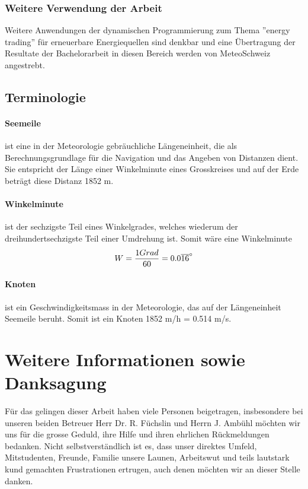 \documentclass[a4paper,10pt]{article}
\begin{document}
\subsubsection{Weitere Verwendung der Arbeit}
Weitere Anwendungen der dynamischen Programmierung zum Thema ''energy
trading'' für erneuerbare Energiequellen sind denkbar und eine Übertragung der
Resultate der Bachelorarbeit in diesen Bereich werden von MeteoSchweiz
angestrebt.

\subsection{Terminologie}
\paragraph{Seemeile}ist eine in der Meteorologie gebräuchliche Längeneinheit,
die als Berechnungsgrundlage für die Navigation und das Angeben von Distanzen
dient. Sie entspricht der Länge einer Winkelminute eines Grosskreises und auf der
Erde beträgt diese Distanz 1852 m.

\paragraph{Winkelminute}ist der sechzigste Teil eines Winkelgrades, welches
wiederum der dreihundertsechzigste Teil einer Umdrehung ist. Somit wäre eine
Winkelminute 
\begin{equation}
\centering
W=\frac{1 Grad}{60} = 0.0\overline{16}^\circ
\end{equation}

\paragraph{Knoten}ist ein Geschwindigkeitsmass in der Meteorologie, das auf der
Längeneinheit Seemeile beruht. Somit ist ein Knoten 1852 m/h = 0.514 m/s.


\section{Weitere Informationen sowie Danksagung}
Für das gelingen dieser Arbeit haben viele Personen beigetragen, insbesondere
bei unseren beiden Betreuer Herr Dr. R. Füchslin und Herrn J. Ambühl möchten
wir uns für die grosse Geduld, ihre Hilfe und ihren ehrlichen Rückmeldungen
bedanken. Nicht selbstverständlich ist es, dass unser direktes Umfeld,
Mitstudenten, Freunde, Familie unsere Launen, Arbeitswut und teils lautstark
kund gemachten Frustrationen ertrugen, auch denen möchten wir an dieser Stelle
danken.
\end{document}
